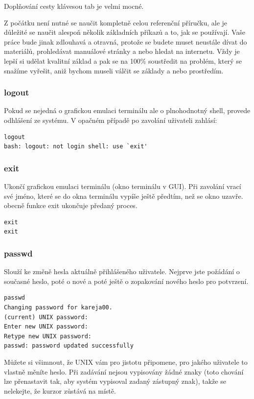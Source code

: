 \documentclass{article}
\begin{document}
\begin{center}
Doplňování cesty klávesou tab je velmi mocné. \cite{vychodilPrirucka}
\end{center}

Z počátku není nutné se naučit kompletně celou referenční příručku, ale je důležité se naučit alespoň několik základních příkazů a to, jak se používají. Vaše práce bude jinak zdlouhavá a otravná, protože se budete muset neustále dívat do materiálů, prohledávat manuálové stránky a nebo hledat na internetu. Vždy je lepší si udělat kvalitní základ a pak se na 100\% soustředit na problém, který se snažíme vyřešit, aniž bychom museli válčit se základy a nebo prostředím.

\subsubsection{logout}
Pokud se nejedná o grafickou emulaci terminálu ale o plnohodnotný shell, provede odhlášení ze systému. V opačném případě po zavolání uživateli zahlásí:
\begin{verbatim}
logout
bash: logout: not login shell: use `exit'
\end{verbatim}

\subsubsection{exit}
Ukončí grafickou emulaci terminálu (okno terminálu v GUI). Při zavolání vrací své jméno, které se do okna terminálu vypíše ještě předtím, než se okno uzavře. obecně funkce exit ukončuje předaný proces.

\begin{verbatim}
exit
exit
\end{verbatim}

\subsubsection{passwd}
Slouží ke změně hesla aktuálně přihlášeného uživatele. Nejprve jste požádání o současné heslo, poté o nové a poté ještě o zopakování nového heslo pro potvrzení.
\begin{verbatim}
passwd
Changing password for kareja00.
(current) UNIX password: 
Enter new UNIX password: 
Retype new UNIX password: 
passwd: password updated successfully
\end{verbatim}
Můžete si všimnout, že UNIX vám pro jistotu připomene, pro jakého uživatele to vlastně měníte heslo. Při zadávání nejsou vypisovány žádné znaky (toto chování lze přenastavit tak, aby systém vypisoval zadaný zástupný znak), takže se nelekejte, že kurzor zůstává na místě.
\end{document}
